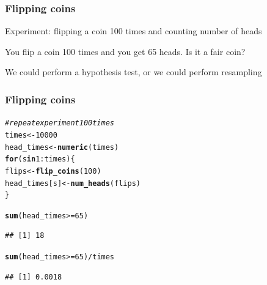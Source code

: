 \documentclass[12pt]{beamer}\usepackage[]{graphicx}\usepackage[]{color}
\makeatletter
\newcommand{\hlnum}[1]{\textcolor[rgb]{0.686,0.059,0.569}{#1}}%
\newcommand{\hlcom}[1]{\textcolor[rgb]{0.678,0.584,0.686}{\textit{#1}}}%
\newcommand{\hlopt}[1]{\textcolor[rgb]{0,0,0}{#1}}%
\newcommand{\hlstd}[1]{\textcolor[rgb]{0.345,0.345,0.345}{#1}}%
\newcommand{\hlkwa}[1]{\textcolor[rgb]{0.161,0.373,0.58}{\textbf{#1}}}%
\newcommand{\hlkwb}[1]{\textcolor[rgb]{0.69,0.353,0.396}{#1}}%
\newcommand{\hlkwd}[1]{\textcolor[rgb]{0.737,0.353,0.396}{\textbf{#1}}}%
\newenvironment{kframe}{%
 \def\at@end@of@kframe{}%
 \ifinner\ifhmode%
  \def\at@end@of@kframe{\end{minipage}}%
  \begin{minipage}{\columnwidth}%
 \fi\fi%
 \def\FrameCommand##1{\hskip\@totalleftmargin \hskip-\fboxsep
 \colorbox{shadecolor}{##1}\hskip-\fboxsep
     \hskip-\linewidth \hskip-\@totalleftmargin \hskip\columnwidth}%
 \MakeFramed {\advance\hsize-\width
   \@totalleftmargin\z@ \linewidth\hsize
   \@setminipage}}%
 {\par\unskip\endMakeFramed%
 \at@end@of@kframe}
\newenvironment{knitrout}{}{} %
\makeatother
\begin{document}

\begin{frame}[fragile]
\frametitle{Flipping coins}

Experiment: flipping a coin 100 times and counting number of heads

\bigskip
You flip a coin 100 times and you get 65 heads. Is it a fair coin?

\bigskip
\pause
We could perform a hypothesis test, or we could perform resampling

\end{frame}


\begin{frame}[fragile]
\frametitle{Flipping coins}

\begin{knitrout}\footnotesize
{}\color{fgcolor}\begin{kframe}
\begin{alltt}
\hlcom{# repeat experiment 100 times}
\hlstd{times} \hlkwb{<-} \hlnum{10000}
\hlstd{head_times} \hlkwb{<-} \hlkwd{numeric}\hlstd{(times)}
\hlkwa{for} \hlstd{(s} \hlkwa{in} \hlnum{1}\hlopt{:}\hlstd{times) \{}
  \hlstd{flips} \hlkwb{<-} \hlkwd{flip_coins}\hlstd{(}\hlnum{100}\hlstd{)}
  \hlstd{head_times[s]} \hlkwb{<-} \hlkwd{num_heads}\hlstd{(flips)}
\hlstd{\}}

\hlkwd{sum}\hlstd{(head_times} \hlopt{>=} \hlnum{65}\hlstd{)}
\end{alltt}
\begin{verbatim}
## [1] 18
\end{verbatim}
\begin{alltt}
\hlkwd{sum}\hlstd{(head_times} \hlopt{>=} \hlnum{65}\hlstd{)} \hlopt{/} \hlstd{times}
\end{alltt}
\begin{verbatim}
## [1] 0.0018
\end{verbatim}
\end{kframe}
\end{knitrout}

\end{frame}

\end{document}
